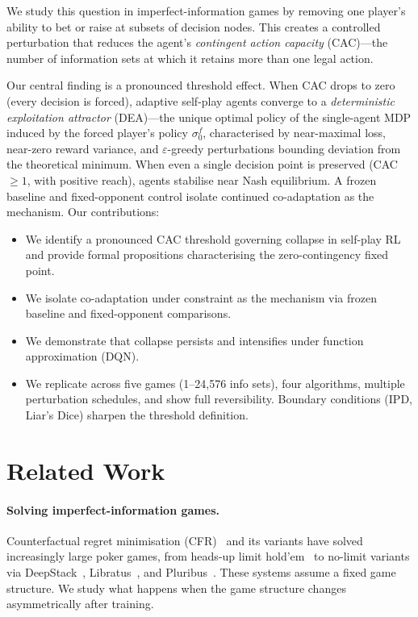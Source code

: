 \documentclass{article}
\begin{document}
We study this question in imperfect-information games by removing one player's ability to bet or raise at subsets of decision nodes. This creates a controlled perturbation that reduces the agent's \emph{contingent action capacity} (CAC)---the number of information sets at which it retains more than one legal action.

Our central finding is a pronounced threshold effect. When CAC drops to zero (every decision is forced), adaptive self-play agents converge to a \emph{deterministic exploitation attractor} (DEA)---the unique optimal policy of the single-agent MDP induced by the forced player's policy $\sigma_0^f$, characterised by near-maximal loss, near-zero reward variance, and $\varepsilon$-greedy perturbations bounding deviation from the theoretical minimum. When even a single decision point is preserved (CAC $\geq 1$, with positive reach), agents stabilise near Nash equilibrium. A frozen baseline and fixed-opponent control isolate continued co-adaptation as the mechanism. Our contributions:
\begin{itemize}
  \item We identify a pronounced CAC threshold governing collapse in self-play RL and provide formal propositions characterising the zero-contingency fixed point.
  \item We isolate co-adaptation under constraint as the mechanism via frozen baseline and fixed-opponent comparisons.
  \item We demonstrate that collapse persists and intensifies under function approximation (DQN).
  \item We replicate across five games (1--24{,}576 info sets), four algorithms, multiple perturbation schedules, and show full reversibility. Boundary conditions (IPD, Liar's Dice) sharpen the threshold definition.
\end{itemize}

\section{Related Work}

\paragraph{Solving imperfect-information games.}
Counterfactual regret minimisation (CFR)~\citep{zinkevich2007regret} and its variants have solved increasingly large poker games, from heads-up limit hold'em~\citep{bowling2015heads} to no-limit variants via DeepStack~\citep{moravcik2017deepstack}, Libratus~\citep{brown2018superhuman}, and Pluribus~\citep{brown2019superhuman}. These systems assume a fixed game structure. We study what happens when the game structure changes asymmetrically after training.
\end{document}

